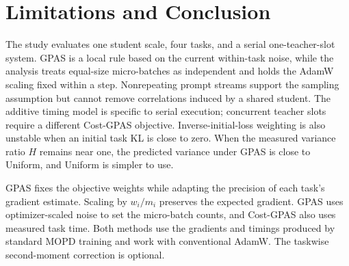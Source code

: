 \section{Limitations and Conclusion}
\label{sec:conclusion}

The study evaluates one student scale, four tasks, and a serial one-teacher-slot
system. GPAS is a local rule based on the current within-task noise, while the
analysis treats equal-size micro-batches as independent and holds the AdamW
scaling fixed within a step. Nonrepeating prompt streams support the sampling
assumption but cannot remove correlations induced by a shared student. The
additive timing model is specific to serial execution; concurrent teacher slots
require a different Cost-GPAS objective. Inverse-initial-loss weighting is also
unstable when an initial task KL is close to zero. When the measured
variance ratio $H$ remains near one, the predicted variance under GPAS is close
to Uniform, and Uniform is simpler to use.

GPAS fixes the objective weights while adapting the precision of each task's
gradient estimate. Scaling by $w_i/m_i$ preserves the expected gradient. GPAS
uses optimizer-scaled noise to set the micro-batch counts, and Cost-GPAS also
uses measured task time. Both methods use the gradients and timings produced by
standard MOPD training and work with conventional AdamW. The taskwise
second-moment correction is optional. 

